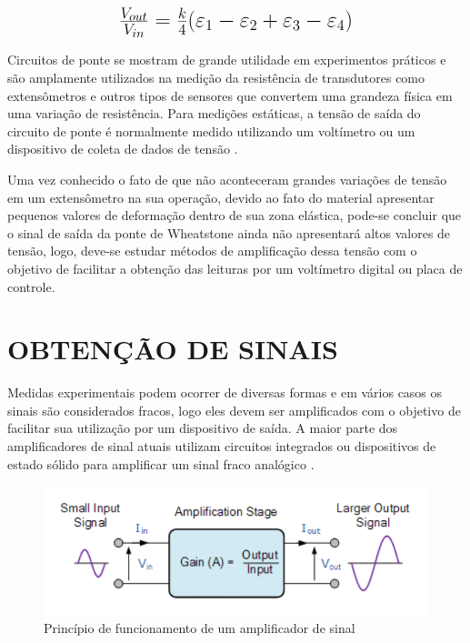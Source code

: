 \begin{equation}\label{eq:Eq_225}%
\mbox{\fontsize{17.28}{21.6}\selectfont\( %
\frac{V_{out}}{V_{in}} = \frac{k}{4}(\varepsilon_1 - \varepsilon_2 + \varepsilon_3 - \varepsilon_4)
\)} %
\end{equation}

%
%
%
%

\hfill

Circuitos de ponte se mostram de grande utilidade em experimentos práticos e são amplamente utilizados na medição da resistência de transdutores como extensômetros
e outros tipos de sensores que convertem uma grandeza física em uma variação de resistência. Para medições estáticas, a tensão de saída do circuito de ponte é normalmente
medido utilizando um voltímetro ou um dispositivo de coleta de dados de tensão \autocite{Hollman2011}.

Uma vez conhecido o fato de que não aconteceram grandes variações de tensão em um extensômetro na sua operação, devido ao fato do material apresentar pequenos valores de
deformação dentro de sua zona elástica, pode-se concluir que o sinal de saída da ponte de Wheatstone ainda não apresentará altos valores de tensão, logo, deve-se estudar métodos de
amplificação dessa tensão com o objetivo de facilitar a obtenção das leituras por um voltímetro digital ou placa de controle.

\section{OBTENÇÃO DE SINAIS}

Medidas experimentais podem ocorrer de diversas formas e em vários casos os sinais são considerados fracos, logo eles devem ser amplificados com o objetivo de facilitar sua
utilização por um dispositivo de saída. A maior parte dos amplificadores de sinal atuais utilizam circuitos integrados ou dispositivos de estado sólido para amplificar um
sinal fraco analógico \autocite{Hollman2011}.

\begin{figure}[htb]
	\caption{\label{fig:1100} Princípio de funcionamento de um amplificador de sinal}
	\begin{center}
		\includegraphics[width=\textwidth]{pictures/1100.png}
	\end{center}
\end{figure}

